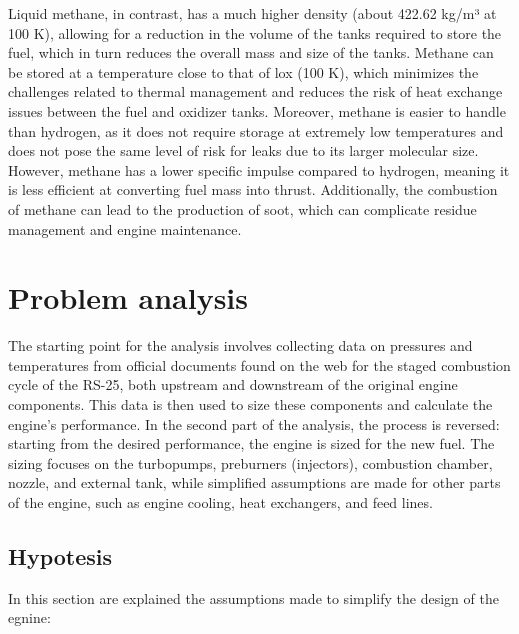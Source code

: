 Liquid methane, in contrast, has a much higher density (about 422.62 kg/m³ at 100 K), allowing for a reduction in the volume of the tanks required to store the fuel, which in turn reduces the overall mass and size of the tanks.
Methane can be stored at a temperature close to that of \acrlong{lox} (100 K), which minimizes the challenges related to thermal management and reduces the risk of heat exchange issues between the fuel and oxidizer tanks.
Moreover, methane is easier to handle than hydrogen, as it does not require storage at extremely low temperatures and does not pose the same level of risk for leaks due to its larger molecular size.
However, methane has a lower specific impulse compared to hydrogen, meaning it is less efficient at converting fuel mass into thrust.
 Additionally, the combustion of methane can lead to the production of soot, which can complicate residue management and engine maintenance.

\section{Problem analysis}
The starting point for the analysis involves collecting data on pressures and temperatures from official documents \cite{file01}\cite{presentation}\cite{doc_4} found on the web for the staged combustion cycle of the RS-25, both upstream and downstream of the original engine components. 
This data is then used to size these components and calculate the engine's performance. 
In the second part of the analysis, the process is reversed: starting from the desired performance, the engine is sized for the new fuel. 
The sizing focuses on the turbopumps, preburners (injectors), combustion chamber, nozzle, and external tank, while simplified assumptions are made for other parts of the engine, such as engine cooling, heat exchangers, and feed lines.
 \subsection{Hypotesis}
 In this section are explained the assumptions made to simplify the design of the egnine: 

